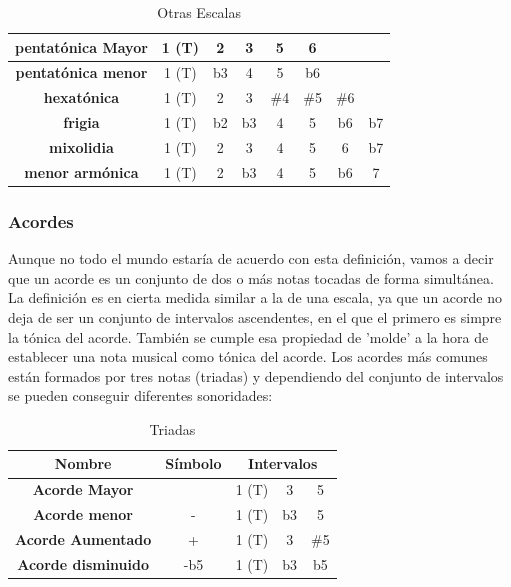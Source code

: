 \begin{table}[h]
    \centering
    \begin{tabular}{c|c|c|c|c|c|c|c}       
        \textbf{pentatónica Mayor} & 1 (T) & 2 & 3 & 5 & \multicolumn{1}{c}{6} \\
        \hline
        \textbf{pentatónica menor} & 1 (T) & b3 & 4 & 5 & \multicolumn{1}{c}{b6} \\
        \hline
        \textbf{hexatónica} & 1 (T) & 2 & 3 & \#4 & \#5 & \multicolumn{1}{c}{\#6}  \\
        \hline
        \textbf{frigia} & 1 (T) & b2 & b3 & 4 & 5 & b6 & b7 \\
        \hline
        \textbf{mixolidia} & 1 (T) & 2 & 3 & 4 & 5 & 6 & b7 \\
        \hline
        \textbf{menor armónica} & 1 (T) & 2 & b3 & 4 & 5 & b6 & 7 \\      
    \end{tabular}
    \caption{Otras Escalas}
    \label{tab:otras_escalas}
\end{table}

    \subsubsection{Acordes}\label{sec:arm:acordes}

    Aunque no todo el mundo estaría de acuerdo con esta definición, vamos a decir que un acorde es un conjunto de dos o más notas tocadas de forma simultánea. La definición es en cierta medida similar a la de una escala, ya que un acorde no deja de ser un conjunto de intervalos ascendentes, en el que el primero es simpre la tónica del acorde. También se cumple esa propiedad de 'molde' a la hora de establecer una nota musical como tónica del acorde. Los acordes más comunes están formados por tres notas (triadas) y dependiendo del conjunto de intervalos se pueden conseguir diferentes sonoridades:

\begin{table}[h]
    \centering
    \begin{tabular}{c|c|c|c|c}       
        \textbf{Nombre} & \textbf{Símbolo} & \multicolumn{3}{c}{\textbf{Intervalos}} \\
        \hline
        \hline
        \textbf{Acorde Mayor} & & 1 (T) & 3 & 5 \\
        \hline
        \textbf{Acorde menor} & - & 1 (T) & b3 & 5 \\
        \hline
        \textbf{Acorde Aumentado} & + & 1 (T) & 3 & \#5 \\
        \hline
        \textbf{Acorde disminuido} & -b5 & 1 (T) & b3 & b5 \\
    \end{tabular}
    \caption{Triadas}
    \label{tab:triads}
\end{table}

